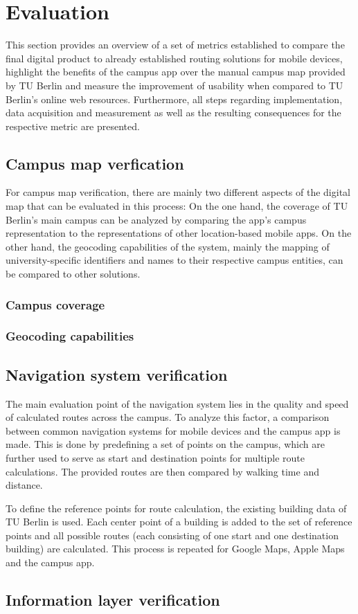 \chapter{Evaluation}
\label{cha:evaluation}
This section provides an overview of a set of metrics established to compare the final digital product to already established routing solutions for mobile devices, highlight the benefits of the campus app over the manual campus map provided by TU Berlin and measure the improvement of usability when compared to TU Berlin's online web resources. Furthermore, all steps regarding implementation, data acquisition and measurement as well as the resulting consequences for the respective metric are presented.

\section{Campus map verfication}
For campus map verification, there are mainly two different aspects of the digital map that can be evaluated in this process: On the one hand, the coverage of TU Berlin's main campus can be analyzed by comparing the app's campus representation to the representations of other location-based mobile apps. On the other hand, the geocoding capabilities of the system, mainly the mapping of university-specific identifiers and names to their respective campus entities, can be compared to other solutions.

\subsection{Campus coverage}

\subsection{Geocoding capabilities}

\section{Navigation system verification}
The main evaluation point of the navigation system lies in the quality and speed of calculated routes across the campus. To analyze this factor, a comparison between common navigation systems for mobile devices and the campus app is made. This is done by predefining a set of points on the campus, which are further used to serve as start and destination points for multiple route calculations. The provided routes are then compared by walking time and distance.

To define the reference points for route calculation, the existing building data of TU Berlin is used. Each center point of a building is added to the set of reference points and all possible routes (each consisting of one start and one destination building) are calculated. This process is repeated for Google Maps, Apple Maps and the campus app.



\section{Information layer verification}